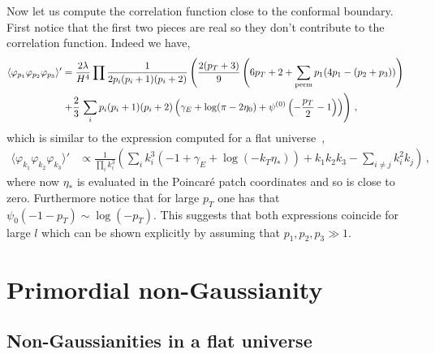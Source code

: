 \documentclass[a4paper,11pt]{article}
\numberwithin{equation}{section}
\numberwithin{equation}{section}
\begin{document}
Now let us compute the correlation function close to the conformal boundary. First notice that the first two pieces are real so they don't contribute to the correlation function. Indeed we have,
\begin{align}
\langle\varphi_{p_1}\varphi_{p_2}\varphi_{p_3}\rangle'&=\frac{2\lambda}{H^4}\prod\frac{1}{2p_i(p_i+1)(p_i+2)}\left( \frac{2(p_T+3)}{9} \left(6p_T+2+\sum_{\rm{perm}}p_1(4p_1-(p_2+p_3))\right)\right.\nonumber\\
&\left.+\frac{2}{3} \,\sum_i p_i (p_i+1)
   (p_i+2)\left(\gamma_E+\log(\pi-2\eta_0)+\psi ^{(0)}\left(-\frac{p_T}{2}-1\right)\right)\right) \,,
&
\label{eq:coeffphi3}
\end{align} 
which is similar to the expression computed for a flat universe~\cite{Creminelli:2011mw},
\begin{align}
\langle\varphi_{k_1}\varphi_{k_2}\varphi_{k_3}\rangle'&\propto \frac{1}{\prod_i k_i^3}\left(\sum_ik_i^3(-1+\gamma_E+\log(-k_T\eta_*))+k_1k_2k_3-\sum_{i\neq j}k_i^2k_j\right) \,,
\end{align}
where now  $\eta_*$ is evaluated in the Poincaré patch coordinates and so is close to zero. Furthermore notice that for large $p_T$ one has that  $\psi_0(-1-p_T)\sim\log (-p_T)$. This suggests that both  expressions coincide for large $l$ which can be shown explicitly by assuming that $p_1,p_2,p_3\gg 1$.


\section{Primordial non-Gaussianity}
\label{sec:PNG}


\subsection{Non-Gaussianities in a flat universe}
\end{document}
